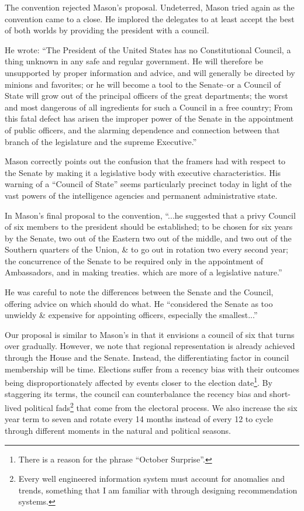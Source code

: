 \documentclass{article}
\newcommand{\quotes}[1]{``#1''}
\begin{document}
The convention rejected Mason's proposal. Undeterred, Mason tried again as the convention came to a close. He implored the delegates to at least accept the best of both worlds by providing the president with a council.

He wrote: \quotes{The President of the United States has no Constitutional Council, a thing unknown in any safe and regular government. He will therefore be unsupported by proper information and advice, and will generally be directed by minions and favorites; or he will become a tool to the Senate--or a Council of State will grow out of the principal officers of the great departments; the worst and most dangerous of all ingredients for such a Council in a free country; From this fatal defect has arisen the improper power of the Senate in the appointment of public officers, and the alarming dependence and connection between that branch of the legislature and the supreme Executive.}\cite{Mason_Objection}

Mason correctly points out the confusion that the framers had with respect to the Senate by making it a legislative body with executive characteristics. His warning of a \quotes{Council of State} seems particularly precinct today in light of the vast powers of the intelligence agencies and permanent administrative state.\cite{Cooper}

In Mason's final proposal to the convention, \quotes{...he suggested that a privy Council of six members to the president should be established; to be chosen for six years by the Senate, two out of the Eastern two out of the middle, and two out of the Southern quarters of the Union, \& to go out in rotation two every second year; the concurrence of the Senate to be required only in the appointment of Ambassadors, and in making treaties. which are more of a legislative nature.}\cite{Madison}

He was careful to note the differences between the Senate and the Council, offering advice on which should do what. He \quotes{considered the Senate as too unwieldy \& expensive for appointing officers, especially the smallest...}

Our proposal is similar to Mason's in that it envisions a council of six that turns over gradually. However, we note that regional representation is already achieved through the House and the Senate. Instead, the differentiating factor in council membership will be time. Elections suffer from a recency bias with their outcomes being disproportionately affected by events closer to the election date\footnote{There is a reason for the phrase \quotes{October Surprise}.}. By staggering its terms, the council can counterbalance the recency bias and short-lived political fads\footnote{Every well engineered information system must account for anomalies and trends, something that I am familiar with through designing recommendation systems.\cite{Seasonality}\cite{Yang}} that come from the electoral process. We also increase the six year term to seven and rotate every 14 months instead of every 12 to cycle through different moments in the natural and political seasons.
\end{document}
